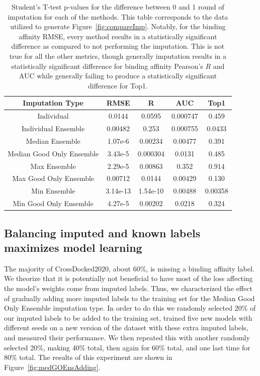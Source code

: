 \documentclass[journal=jcim,manuscript=article]{achemso}
\begin{document}
\begin{table}
    \centering
    \begin{tabular}{c|c|c|c|c}
    Imputation Type & RMSE & R & AUC & Top1 \\
    \hline
    Individual & 0.0144 & 0.0595 & 0.000747 & 0.459 \\
    Individual  Ensemble & 0.00482 & 0.253 & 0.000755 & 0.0433 \\
    Median Ensemble & 1.07e-6 & 0.00234 & 0.00477 & 0.391 \\
    Median Good Only Ensemble & 3.43e-5 & 0.000304 & 0.0131 & 0.485 \\
    Max Ensemble & 2.29e-5 & 0.00863 & 0.352 & 0.914 \\
    Max Good Only Ensemble & 0.00712 & 0.0144 & 0.00429 & 0.130 \\
    Min Ensemble & 3.14e-13 & 1.54e-10 & 0.00488 & 0.00358 \\
    Min Good Only Ensemble & 4.27e-5 & 0.00202 & 0.0218 & 0.324 \\
    \end{tabular}
    \caption{Student's T-test p-values for the difference between 0 and 1 round of imputation for each of the methods. This table corresponds to the data utilized to generate Figure~\ref{fig:compareImp}. Notably, for the binding affinity RMSE, every method results in a statistically significant difference as compared to not performing the imputation. This is not true for all the other metrics, though generally imputation results in a statistically significant difference for binding affinity Pearson's $R$ and AUC while generally failing to produce a statistically significant difference for Top1.}
    \label{tab:ImpTypeSignificance}
\end{table}

\subsection{Balancing imputed and known labels maximizes model learning}
The majority of CrossDocked2020, about 60\%, is missing a binding affinity label.
We theorize that it is potentially not beneficial to have most of the loss affecting the model's weights come from imputed labels.
Thus, we characterized the effect of gradually adding more imputed labels to the training set for the Median Good Only Ensemble imputation type.
In order to do this we randomly selected 20\% of our imputed labels to be added to the training set, trained five new models with different seeds on a new version of the dataset with these extra imputed labels, and measured their performance.
We then repeated this with another randomly selected 20\%, making 40\% total, then again for 60\% total, and one last time for 80\% total.
The results of this experiment are shown in Figure~\ref{fig:medGOEnsAdding}.
\end{document}
